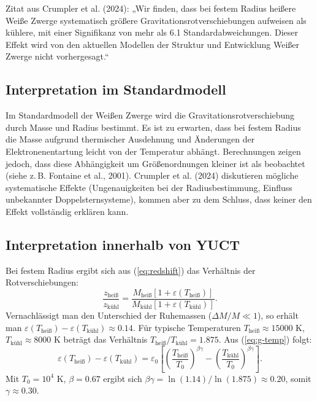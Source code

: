 \documentclass[12pt]{article}
\theoremstyle{remark}
\newcommand{\eps}{\varepsilon}
\begin{document}
	Zitat aus Crumpler et al. (2024): „Wir finden, dass bei festem Radius heißere Weiße Zwerge systematisch größere Gravitationsrotverschiebungen aufweisen als kühlere, mit einer Signifikanz von mehr als 6.1 Standardabweichungen. Dieser Effekt wird von den aktuellen Modellen der Struktur und Entwicklung Weißer Zwerge nicht vorhergesagt.“
	
	\subsection{Interpretation im Standardmodell}
	\label{subsec:wd-standard}
	
	Im Standardmodell der Weißen Zwerge wird die Gravitationsrotverschiebung durch Masse und Radius bestimmt. Es ist zu erwarten, dass bei festem Radius die Masse aufgrund thermischer Ausdehnung und Änderungen der Elektronenentartung leicht von der Temperatur abhängt. Berechnungen zeigen jedoch, dass diese Abhängigkeit um Größenordnungen kleiner ist als beobachtet (siehe z. B. Fontaine et al., 2001). Crumpler et al. (2024) diskutieren mögliche systematische Effekte (Ungenauigkeiten bei der Radiusbestimmung, Einfluss unbekannter Doppelsternsysteme), kommen aber zu dem Schluss, dass keiner den Effekt vollständig erklären kann.
	
	\subsection{Interpretation innerhalb von YUCT}
	\label{subsec:wd-yuct}
	
	Bei festem Radius ergibt sich aus (\ref{eq:redshift}) das Verhältnis der Rotverschiebungen:
	\begin{equation}
		\frac{z_{\text{heiß}}}{z_{\text{kühl}}} = \frac{M_{\text{heiß}}[1+\eps(T_{\text{heiß}})]}{M_{\text{kühl}}[1+\eps(T_{\text{kühl}})]}.
		\label{eq:redshift-ratio}
	\end{equation}
	Vernachlässigt man den Unterschied der Ruhemassen ($\Delta M/M \ll 1$), so erhält man $\eps(T_{\text{heiß}}) - \eps(T_{\text{kühl}}) \approx 0.14$. Für typische Temperaturen $T_{\text{heiß}} \approx 15000$ K, $T_{\text{kühl}} \approx 8000$ K beträgt das Verhältnis $T_{\text{heiß}}/T_{\text{kühl}} = 1.875$. Aus (\ref{eq:g-temp}) folgt:
	\begin{equation}
		\eps(T_{\text{heiß}}) - \eps(T_{\text{kühl}}) = \eps_0 \left[ \left( \frac{T_{\text{heiß}}}{T_0} \right)^{\beta\gamma} - \left( \frac{T_{\text{kühl}}}{T_0} \right)^{\beta\gamma} \right].
		\label{eq:eps-diff}
	\end{equation}
	Mit $T_0 = 10^4$ K, $\beta = 0.67$ ergibt sich $\beta\gamma = \ln(1.14) / \ln(1.875) \approx 0.20$, somit $\gamma \approx 0.30$.
	
\end{document}
